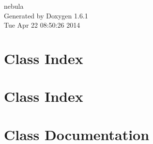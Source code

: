 \documentclass[a4paper]{book}
\begin{document}
\hypersetup{pageanchor=false}
\begin{titlepage}
\vspace*{7cm}
\begin{center}
{\Large nebula }\\
\vspace*{1cm}
{\large Generated by Doxygen 1.6.1}\\
\vspace*{0.5cm}
{\small Tue Apr 22 08:50:26 2014}\\
\end{center}
\end{titlepage}
\clearemptydoublepage
{}
\tableofcontents
\clearemptydoublepage
{}
\hypersetup{pageanchor=true}
\chapter{Class Index}

\chapter{Class Index}

\chapter{Class Documentation}






























\printindex
\end{document}
